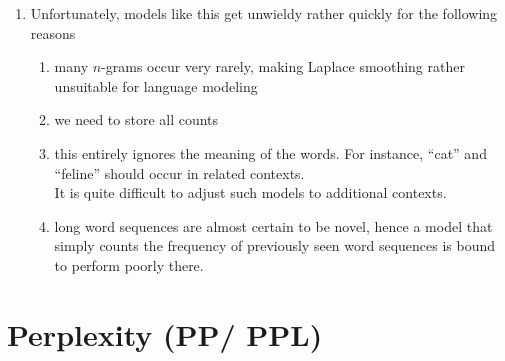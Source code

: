 \begin{enumerate}
    \item Unfortunately, models like this get unwieldy rather quickly for the following reasons
    \begin{enumerate}
        \item many $n$-grams occur very rarely, making Laplace smoothing rather unsuitable for language modeling

        \item we need to store all counts

        \item this entirely ignores the meaning of the words. For instance, “cat” and “feline” should occur in related contexts.\\
        It is quite difficult to adjust such models to additional contexts.

        \item long word sequences are almost certain to be novel, hence a model that simply counts the frequency of previously seen word sequences is bound to perform poorly there.
    \end{enumerate}
\end{enumerate}




\section{Perplexity (PP/ PPL) \cite{nlp-1,dnn-1}}

